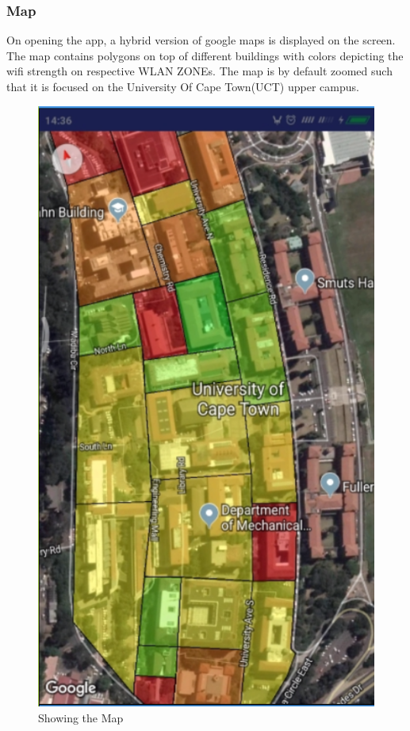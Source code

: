 \subsubsection {Map}
On opening the app, a hybrid version of google maps is displayed on the screen. The map contains polygons on top of different buildings with colors depicting the wifi strength on respective WLAN ZONEs. The map is by default zoomed such that it is focused on the University Of Cape Town(UCT) upper campus.

\begin{figure}
	\centering
	\includegraphics[width=0.7\linewidth]{images_manual/map}
	\caption{Showing the Map}
	\label{fig:map}
\end{figure}

